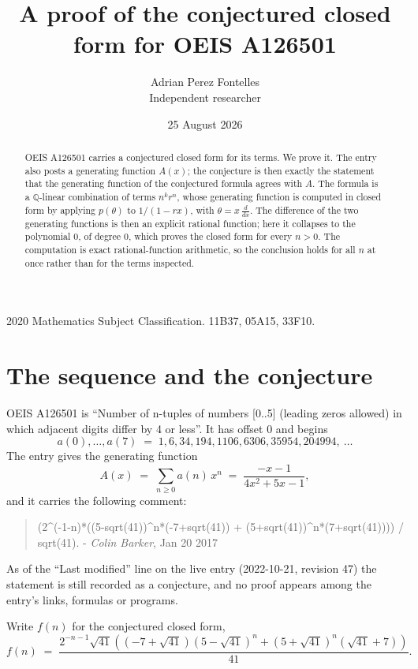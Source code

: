 \documentclass[11pt,a4paper]{article}
\title{A proof of the conjectured closed form for OEIS A126501}
\author{Adrian Perez Fontelles\\ \small Independent researcher}
\date{25 August 2026}
\theoremstyle{plain}
\theoremstyle{definition}
\begin{document}
\maketitle

\begin{abstract}
OEIS A126501 carries a conjectured closed form for its terms. We prove it. The entry
also posts a generating function $A(x)$; the conjecture is then exactly the statement
that the generating function of the conjectured formula agrees with $A$. The formula is
a $\mathbb{Q}$-linear combination of terms $n^{k}r^{n}$, whose generating function is
computed in closed form by applying $p(\theta)$ to $1/(1-rx)$, with
$\theta=x\,\frac{d}{dx}$. The difference of the two generating functions is then an
explicit rational function; here it collapses to the polynomial $0$, of degree
$0$, which proves the closed form for every $n>0$. The computation is exact
rational-function arithmetic, so the conclusion holds for all $n$ at once rather than
for the terms inspected.
\end{abstract}

\noindent\small 2020 Mathematics Subject Classification. 11B37, 05A15, 33F10.\normalsize

\section{The sequence and the conjecture}

OEIS A126501 is ``Number of n-tuples of numbers [0..5] (leading zeros allowed) in which adjacent digits differ by 4 or less''. It has offset $0$ and begins
\[
a(0),\dots,a(7)\;=\;1, 6, 34, 194, 1106, 6306, 35954, 204994,\ \dots
\]
The entry gives the generating function
\begin{equation}\label{eq:gf}
A(x)\;=\;\sum_{n\ge 0} a(n)\,x^{n}\;=\;\frac{- x - 1}{4 x^{2} + 5 x - 1} ,
\end{equation}
and it carries the following comment:
\begin{quote}\small
(2\^{}(-1-n)*((5-sqrt(41))\^{}n*(-7+sqrt(41)) + (5+sqrt(41))\^{}n*(7+sqrt(41)))) / sqrt(41). - \emph{Colin Barker}, Jan 20 2017
\end{quote}
As of the ``Last modified'' line on the live entry (2022-10-21, revision 47) the
statement is still recorded as a conjecture, and no proof appears among the entry's links,
formulas or programs.

Write $f(n)$ for the conjectured closed form,
\[
f(n)\;=\;\frac{2^{- n - 1} \sqrt{41} \left(\left(-7 + \sqrt{41}\right) \left(5 - \sqrt{41}\right)^{n} + \left(5 + \sqrt{41}\right)^{n} \left(\sqrt{41} + 7\right)\right)}{41} .
\]
\end{document}
